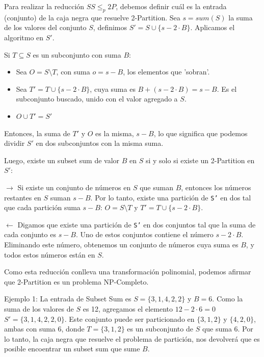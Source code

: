 \documentclass{article}
\begin{document}
Para realizar la reducción $SS \leq_p 2P$, debemos definir cuál es la entrada (conjunto) de la caja negra que resuelve 2-Partition. Sea $s = sum(S)$ la suma de los valores del conjunto $S$, definimos \( S' = S \cup \{s - 2\cdot B\} \). Aplicamos el algoritmo en $S'$.

Si \( T \subseteq S \) es un subconjunto con suma \( B \):

\begin{itemize}
    \item Sea \( O = S \setminus T \), con suma \( o = s - B \), los elementos que 'sobran'.
    \item Sea \( T' = T \cup \{s - 2 \cdot B\} \), cuya suma es \( B + (s - 2 \cdot B) = s - B \). Es el subconjunto buscado, unido con el valor agregado a $S$.
    \item $ O \cup T' = S'$
\end{itemize}

Entonces, la suma de \( T' \) y \( O \) es la misma, \( s - B \), lo que significa que podemos dividir \( S' \) en dos subconjuntos con la misma suma.

Luego, existe un subset sum de valor $B$ en $S$ si y solo si existe un 2-Partition en $S'$:

    $\rightarrow$ Si existe un conjunto de números en $S$ que suman $B$, entonces los números restantes en $S$ suman \(s - B\). Por lo tanto, existe una partición de \texttt{S'} en dos tal que cada partición suma \(s - B\): \( O = S \setminus T \) y \( T' = T \cup \{s - 2 \cdot B\} \). 

    $\leftarrow$ Digamos que existe una partición de \texttt{S'} en dos conjuntos tal que la suma de cada conjunto es \(s - B\). Uno de estos conjuntos contiene el número \(s - 2 \cdot B\). Eliminando este número, obtenemos un conjunto de números cuya suma es $B$, y todos estos números están en $S$.

Como esta reducción conlleva una transformación polinomial, podemos afirmar que 2-Partition es un problema NP-Completo.

Ejemplo 1: La entrada de Subset Sum es \( S = \{3, 1, 4, 2, 2\} \) y \( B = 6 \). Como la suma de los valores de $S$ es 12, agregamos el elemento $12 - 2 \cdot 6 = 0$ \( S' = \{3, 1, 4, 2, 2, 0\} \). Este conjunto puede ser particionado en \( \{3, 1, 2\} \) y \( \{4, 2, 0\} \), ambas con suma 6, donde \( T = \{3, 1, 2\} \) es un subconjunto de \( S \) que suma \( 6 \). Por lo tanto, la caja negra que resuelve el problema de partición, nos devolverá que es posible encoentrar un subset sum que sume $B$.
\end{document}
